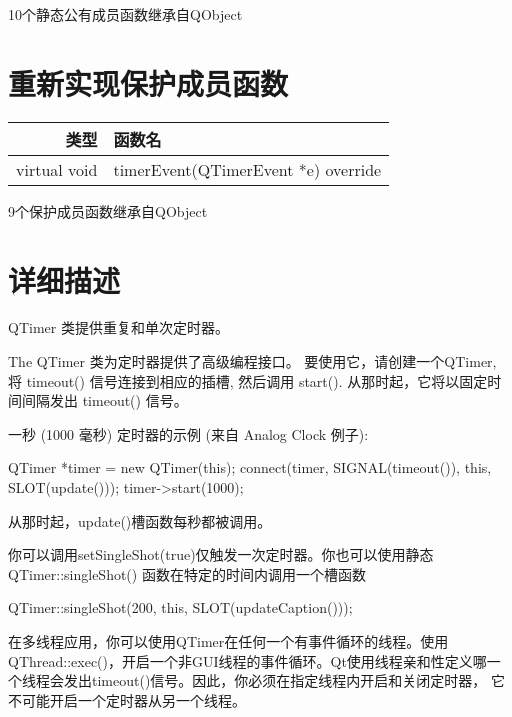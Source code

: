 \begin{compactitem}
\item 10个静态公有成员函数继承自QObject
\end{compactitem}

\section{重新实现保护成员函数}


\begin{tabular}{|r|l|}
	\hline
	类型	 & 函数名 \\
	\hline
virtual void	& timerEvent(QTimerEvent *e) override \\ 
\hline
\end{tabular}


\begin{compactitem}
\item 9个保护成员函数继承自QObject
\end{compactitem}

\section{详细描述}

QTimer 类提供重复和单次定时器。

The QTimer 类为定时器提供了高级编程接口。 要使用它，请创建一个QTimer, 将 timeout() 信号连接到相应的插槽, 然后调用 start(). 从那时起，它将以固定时间间隔发出 timeout() 信号。

一秒 (1000 毫秒) 定时器的示例 (来自 Analog Clock 例子):

\begin{cppcode}
QTimer *timer = new QTimer(this);
connect(timer, SIGNAL(timeout()), this, SLOT(update()));
timer->start(1000);
\end{cppcode}


从那时起，update()槽函数每秒都被调用。

你可以调用setSingleShot(true)仅触发一次定时器。你也可以使用静态QTimer::singleShot() 函数在特定的时间内调用一个槽函数

\begin{cppcode}
QTimer::singleShot(200, this, SLOT(updateCaption()));
\end{cppcode}

在多线程应用，你可以使用QTimer在任何一个有事件循环的线程。使用QThread::exec()，开启一个非GUI线程的事件循环。Qt使用线程亲和性定义哪一个线程会发出timeout()信号。因此，你必须在指定线程内开启和关闭定时器， 它不可能开启一个定时器从另一个线程。

